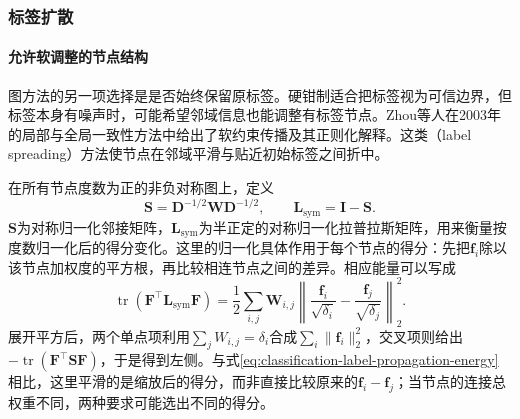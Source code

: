 \subsubsection{标签扩散}
\label{sec:classification-label-spreading}

\paragraph{允许软调整的节点结构}
图方法的另一项选择是是否始终保留原标签。硬钳制适合把标签视为可信边界，但标签本身有噪声时，可能希望邻域信息也能调整有标签节点。Zhou等人在2003年的局部与全局一致性方法中给出了软约束传播及其正则化解释。这类（label spreading）方法使节点在邻域平滑与贴近初始标签之间折中。

在所有节点度数为正的非负对称图上，定义
\begin{equation}
  \label{eq:classification-label-spreading-matrices}
  \bm{S}=\bm{D}^{-1/2}\bm{W}\bm{D}^{-1/2},
  \qquad
  \bm{L}_{\mathrm{sym}}=\bm{I}-\bm{S}.
\end{equation}
$\bm{S}$为对称归一化邻接矩阵，$\bm{L}_{\mathrm{sym}}$为半正定的对称归一化拉普拉斯矩阵，用来衡量按度数归一化后的得分变化。这里的归一化具体作用于每个节点的得分：先把$\bm f_i$除以该节点加权度的平方根，再比较相连节点之间的差异。相应能量可以写成
\begin{equation}
  \label{eq:classification-label-spreading-energy}
  \operatorname{tr}(\bm F^\top\bm L_{\mathrm{sym}}\bm F)
    =\frac12\sum_{i,j}\bm W_{i,j}
       \left\lVert\frac{\bm f_i}{\sqrt{\delta_i}}
                    -\frac{\bm f_j}{\sqrt{\delta_j}}\right\rVert_2^2.
\end{equation}
展开平方后，两个单点项利用$\sum_jW_{i,j}=\delta_i$合成$\sum_i\lVert\bm f_i\rVert_2^2$，交叉项则给出$-\operatorname{tr}(\bm F^\top\bm S\bm F)$，于是得到左侧。与式\eqref{eq:classification-label-propagation-energy}相比，这里平滑的是缩放后的得分，而非直接比较原来的$\bm f_i-\bm f_j$；当节点的连接总权重不同，两种要求可能选出不同的得分。

